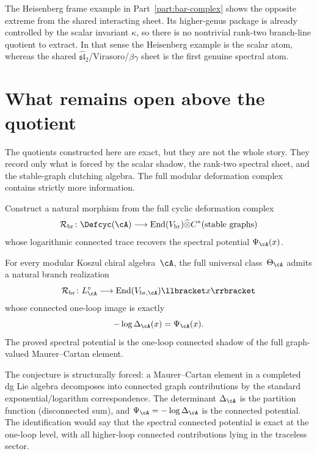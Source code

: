 \begin{example}
\label{ex:heisenberg-scalar-only-frame}
The Heisenberg frame example in Part~\ref{part:bar-complex} shows the opposite extreme from
the shared interacting sheet. Its higher-genus package is already
controlled by the scalar invariant \(\kappa\), so there is no nontrivial
rank-two branch-line quotient to extract. In that sense the Heisenberg
example is the scalar atom, whereas the shared
\(\widehat{\mathfrak{sl}}_2\)/Virasoro/\(\beta\gamma\) sheet is the
first genuine spectral atom.
\end{example}

\section{What remains open above the quotient}
\label{sec:blr-open-above-quotient}

The quotients constructed here are exact, but they are not the whole
story. They record only what is forced by the scalar shadow, the
rank-two spectral sheet, and the stable-graph clutching algebra. The
full modular deformation complex contains strictly more information.

\begin{problem}
\label{prob:branch-realization-full-cyclic}
Construct a natural morphism from the full cyclic deformation complex
\[
\mathcal R_{\mathrm{br}}\colon
\Defcyc(\cA)
\longrightarrow
\operatorname{End}(V_{\mathrm{br}})\widehat\otimes
C^*(\text{stable graphs})
\]
whose logarithmic connected trace recovers the spectral potential
\(\Psi_{\cA}(x)\).
\end{problem}

\begin{conjecture}
\label{conj:spectral-shadow-principle}
For every modular Koszul chiral algebra~$\cA$, the full universal
class~$\Theta_{\cA}$ admits a natural branch realization
\[
\mathcal R_{\mathrm{br}}\colon
L_{\cA}^\circ
\longrightarrow
\operatorname{End}(V_{\mathrm{br},\cA})\llbracket x\rrbracket
\]
whose connected one-loop image is exactly
\[
-\log\Delta_{\cA}(x) = \Psi_{\cA}(x).
\]
The proved spectral potential is the one-loop
connected shadow of the full graph-valued Maurer--Cartan element.
\end{conjecture}

\begin{remark}
\label{rem:logarithm-canonical}
The conjecture is structurally forced: a Maurer--Cartan element in a
completed dg Lie algebra decomposes into connected graph contributions by
the standard exponential/logarithm correspondence. The determinant
$\Delta_{\cA}$ is the partition function (disconnected sum), and
$\Psi_{\cA}=-\log\Delta_{\cA}$ is the connected potential. The
identification would say that the spectral connected potential is exact
at the one-loop level, with all higher-loop connected contributions lying
in the traceless sector.
\end{remark}

